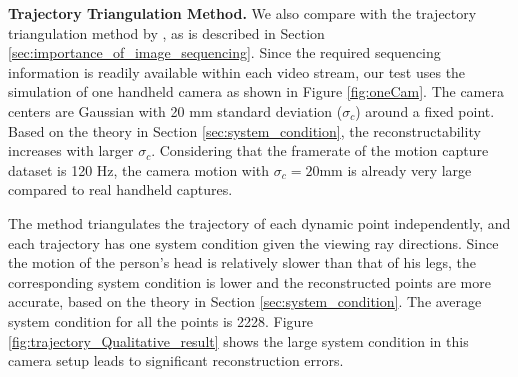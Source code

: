 \textbf{Trajectory Triangulation Method.} We also compare with the trajectory triangulation method by  \citet{Valmadre_CVPR2012}, as is described in Section \ref{sec:importance_of_image_sequencing}. 
Since the required sequencing information is readily available within each video stream, our test uses the simulation of one handheld camera as shown in Figure \ref{fig:oneCam}. The camera centers are Gaussian with 20 mm standard deviation ($\sigma_c$) around a fixed point. %
Based on the theory in Section \ref{sec:system_condition}, the reconstructability increases with larger $\sigma_c$.
Considering that the framerate of the motion capture dataset is 120 Hz, the camera motion with  $\sigma_c = 20$mm is already very large compared to real handheld captures.

The method triangulates the trajectory of each dynamic point independently, and 
each trajectory has one system condition given the viewing ray directions. 
Since the motion of the person's head is relatively slower than that of his legs, the corresponding system condition is lower and the reconstructed points are more accurate, based on the theory in Section \ref{sec:system_condition}. 
The average system condition for all the points is 2228. 
Figure \ref{fig:trajectory_Qualitative_result} shows the large system condition in this camera setup leads to significant reconstruction errors.

